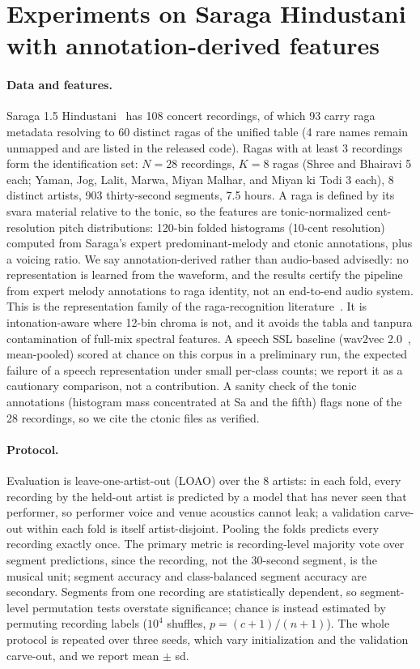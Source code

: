 \documentclass[11pt]{article}
\begin{document}
\section{Experiments on Saraga Hindustani with annotation-derived
features}\label{sec:real}

\paragraph{Data and features.}
Saraga 1.5 Hindustani~\cite{saraga} has 108 concert recordings, of which 93
carry raga metadata resolving to 60 distinct ragas of the unified table (4
rare names remain unmapped and are listed in the released code). Ragas with
at least 3 recordings form the identification set: $N = 28$ recordings,
$K = 8$ ragas (Shree and Bhairavi 5 each; Yaman, Jog, Lalit, Marwa, Miyan
Malhar, and Miyan ki Todi 3 each), 8 distinct artists, 903 thirty-second
segments, 7.5 hours. A raga is defined by its svara material relative to the
tonic, so the features are tonic-normalized cent-resolution pitch
distributions: 120-bin folded histograms (10-cent resolution) computed from
Saraga's expert predominant-melody and ctonic annotations, plus a voicing
ratio. We say annotation-derived rather than audio-based advisedly: no
representation is learned from the waveform, and the results certify the
pipeline from expert melody annotations to raga identity, not an end-to-end
audio system. This is the representation family of the raga-recognition
literature~\cite{chordia2007,koduri2012,gulati2016}. It is intonation-aware
where 12-bin chroma is not, and it avoids the tabla and tanpura contamination
of full-mix spectral features. A speech SSL baseline (wav2vec
2.0~\cite{wav2vec}, mean-pooled) scored at chance on this corpus in a
preliminary run, the expected failure of a speech representation under small
per-class counts; we report it as a cautionary comparison, not a
contribution. A sanity check of the tonic annotations (histogram mass
concentrated at Sa and the fifth) flags none of the 28 recordings, so we cite
the ctonic files as verified.

\paragraph{Protocol.}
Evaluation is leave-one-artist-out (LOAO) over the 8 artists: in each fold,
every recording by the held-out artist is predicted by a model that has never
seen that performer, so performer voice and venue acoustics cannot leak; a
validation carve-out within each fold is itself artist-disjoint. Pooling the
folds predicts every recording exactly once. The primary metric is
recording-level majority vote over segment predictions, since the recording,
not the 30-second segment, is the musical unit; segment accuracy and
class-balanced segment accuracy are secondary. Segments from one recording
are statistically dependent, so segment-level permutation tests overstate
significance; chance is instead estimated by permuting recording labels
($10^4$ shuffles, $p = (c+1)/(n+1)$). The whole protocol is repeated over
three seeds, which vary initialization and the validation carve-out, and we
report mean $\pm$ sd.
\end{document}
